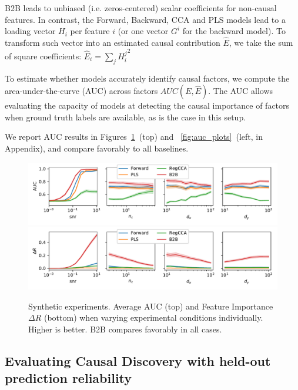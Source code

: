 B2B leads to unbiased (i.e. zeros-centered) scalar coefficients for non-causal
features. In contrast, the Forward, Backward, CCA and PLS models lead to a
loading vector $H_i$ per feature $i$ (or one vector $G^i$ for the backward
model). To transform such vector into an estimated causal contribution $\hat E$,
we take the sum of square coefficients:
  $\hat E_i = \sum_j {H^j_i}^2 $

To estimate whether models accurately identify causal factors, we compute the
area-under-the-curve (AUC) across factors $AUC(E, \hat E)$.
The AUC allows evaluating the capacity of models at detecting the causal
importance of factors when ground truth labels are available, as is the case in
this setup.

We report AUC results in Figures~\ref{fig:percondition}~(top) and ~\ref{fig:auc_plots}~(left, in Appendix), and compare favorably to all baselines.

\begin{figure}[t]
  \centering
  \includegraphics[width=\linewidth]{figures/auc_condition.pdf}
  \includegraphics[width=\linewidth]{figures/r_in_condition.pdf}
  \vspace{-4ex}
  \caption{Synthetic experiments. Average AUC (top) and Feature Importance $\Delta R$ (bottom) when varying experimental conditions individually. Higher is better. B2B compares favorably in all cases. \label{fig:percondition}}
\end{figure}


\subsection{Evaluating Causal Discovery with held-out prediction reliability}

